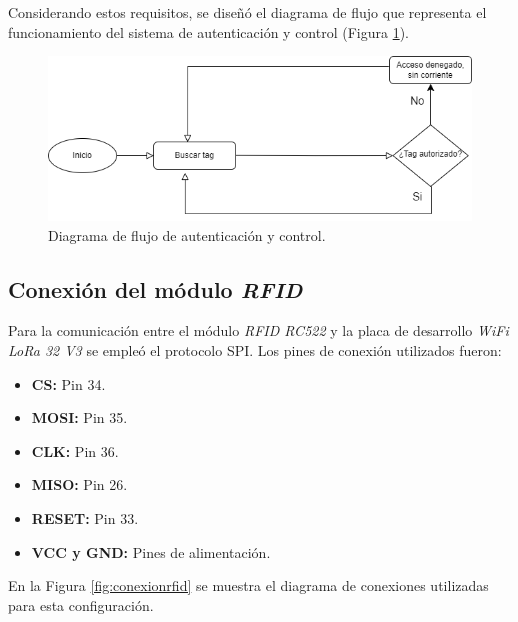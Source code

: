 Considerando estos requisitos, se diseñó el diagrama de flujo que representa el funcionamiento del sistema de autenticación y control (Figura \ref{fig:rfid1}).

\begin{figure}[H]
    \centering
    \includegraphics[scale=0.5]{./capitulo_04/imagen/diagramadeflujoRFID-Page-1.drawio.png}
    \caption{Diagrama de flujo de autenticación y control.}
    \label{fig:rfid1}
\end{figure}

\subsection{Conexión del módulo \textit{RFID}}

Para la comunicación entre el módulo \textit{RFID RC522} y la placa de desarrollo \textit{WiFi LoRa 32 V3} se empleó el protocolo SPI. Los pines de conexión utilizados fueron: 
\begin{itemize}
    \item \textbf{CS:} Pin 34.
    \item \textbf{MOSI:} Pin 35.
    \item \textbf{CLK:} Pin 36.
    \item \textbf{MISO:} Pin 26.
    \item \textbf{RESET:} Pin 33.
    \item \textbf{VCC y GND:} Pines de alimentación.
\end{itemize}

En la Figura \ref{fig:conexionrfid} se muestra el diagrama de conexiones utilizadas para esta configuración.

